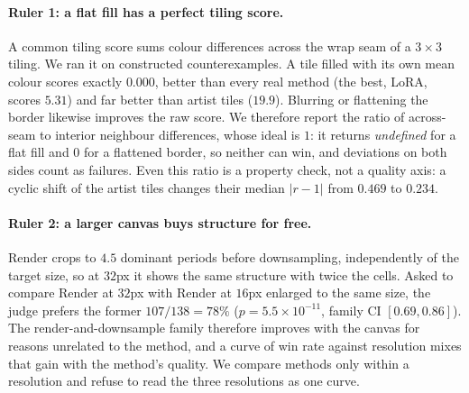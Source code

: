 \documentclass{article}
\begin{document}
\paragraph{Ruler 1: a flat fill has a perfect tiling score.} A common tiling
score sums colour differences across the wrap seam of a $3\times3$ tiling. We
ran it on constructed counterexamples. A tile filled with its own mean colour
scores exactly $0.000$, better than every real method (the best, LoRA, scores
$5.31$) and far better than artist tiles ($19.9$). Blurring or flattening the
border likewise improves the raw score. We therefore report the ratio of
across-seam to interior neighbour differences, whose ideal is $1$: it returns
\emph{undefined} for a flat fill and $0$ for a flattened border, so neither
can win, and deviations on both sides count as failures. Even this ratio is a
property check, not a quality axis: a cyclic shift of the artist tiles changes
their median $|r-1|$ from $0.469$ to $0.234$.

\paragraph{Ruler 2: a larger canvas buys structure for free.} Render crops to
$4.5$ dominant periods before downsampling, independently of the
target size, so at $32$px it shows the same structure with twice the cells.
Asked to compare Render at $32$px with Render at $16$px enlarged to the same size, the
judge prefers the former $107/138=78\%$ ($p=5.5\times10^{-11}$, family CI
$[0.69,0.86]$). The render-and-downsample family therefore improves with the
canvas for reasons unrelated to the method, and a curve of win rate against
resolution mixes that gain with the method's quality. We compare methods only
within a resolution and refuse to read the three resolutions as one curve.
\end{document}
